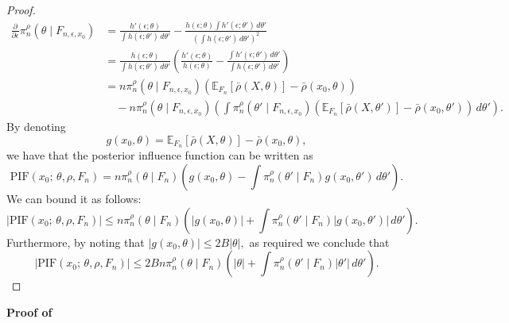 \documentclass[11pt, oneside]{amsart}
\theoremstyle{definition}   %
\newcommand{\E}{\mathbb{E}}
\newcommand{\loss}{\rho}
\newcommand{\closs}{\bar{\loss}}
\newcommand{\mposterior}{\pi_n^{\loss}}
\begin{document}
\begin{proof}
\begin{equation*}
\begin{split}
        \frac{\partial}{\partial \epsilon} \mposterior(\theta \mid F_{n,\epsilon,x_0}) &= \frac{h' (\epsilon; \theta)}{\int h(\epsilon; \theta') \, d\theta'} - \frac{h(\epsilon; \theta) \int h'(\epsilon; \theta') \, d\theta'}{\left ( \int h(\epsilon; \theta') \, d\theta' \right ) ^ 2} \\
        &= \frac{h(\epsilon; \theta)}{\int h(\epsilon; \theta') \, d\theta'} \left ( \frac{h'(\epsilon; \theta)}{h(\epsilon; \theta)} - \frac{\int h'(\epsilon; \theta') \, d\theta'}{\int h(\epsilon; \theta') \, d\theta'} \right ) \\
        &= n \mposterior(\theta \mid F_{n,\epsilon,x_0}) \left ( \E_{F_n} [ \closs(X, \theta) ] - \closs(x_0, \theta) \right ) \\
        &\quad - n \mposterior(\theta \mid F_{n,\epsilon,x_0}) \left ( \int \mposterior(\theta' \mid F_{n,\epsilon,x_0}) ( \E_{F_n} [ \closs(X, \theta') ] - \closs(x_0, \theta') ) \, d\theta' \right ).
    \end{split}
    \end{equation*}
    By denoting
    \begin{equation}
    \label{eqn::defining-function-g}
        g(x_0, \theta) = \E_{F_n} [ \closs(X, \theta) ] - \closs(x_0, \theta),
    \end{equation}
    we have that the posterior influence function can be written as
    \begin{equation*}
        \textrm{PIF}(x_0; \,\theta, \rho, F_n) = n \mposterior(\theta \mid F_n) \left ( g(x_0, \theta) - \int \mposterior(\theta' \mid F_n) g(x_0, \theta') \, d\theta' \right ).
    \end{equation*}
    We can bound it as follows:
    \begin{equation}
    \label{eqn::bound-on-PIF} 
        |\textrm{PIF}(x_0; \,\theta, \rho, F_n)| \leq n \mposterior(\theta \mid F_n) \left ( | g(x_0, \theta) | + \int \mposterior(\theta' \mid F_n) |g(x_0, \theta')| \, d\theta' \right ).
    \end{equation}
    Furthermore, by noting that $\left | g(x_0, \theta) \right | \leq 2B |\theta |,$ as required we conclude that
    \begin{equation}
    \label{eqn::bound-on-PIF-2}
        |\textrm{PIF}(x_0; \,\theta, \rho, F_n)|
        \leq 2B n \mposterior(\theta \mid F_n) \left ( | \theta | + \int \mposterior(\theta' \mid F_n) |\theta'| \, d\theta' \right ).
   \end{equation}
\end{proof}
%
\noindent \textbf{Proof of }
\end{document}
